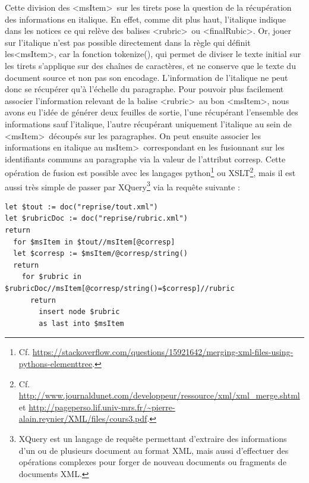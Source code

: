 \documentclass[a4paper,12pt,twoside]{book}
\begin{document}
Cette division des \textless msItem\textgreater~sur les tirets pose la question de la récupération des informations en italique. En effet, comme dit plus haut, l'italique indique dans les notices ce qui relève des balises \textless rubric\textgreater~ou \textless finalRubic\textgreater . Or, jouer sur l'italique n'est pas possible directement dans la règle qui définit les\textless msItem\textgreater, car la fonction tokenize(), qui permet de diviser le texte initial sur les tirets s'applique sur des chaînes de caractères, et ne conserve que le texte du document source et non pas son encodage. L'information de l'italique ne peut donc se récupérer qu'à l'échelle du paragraphe. Pour pouvoir plus facilement associer l'information relevant de la balise \textless rubric\textgreater~au bon \textless msItem\textgreater, nous avons eu l'idée de générer deux feuilles de sortie, l'une récupérant l'ensemble des informations sauf l'italique, l'autre récupérant uniquement l'italique au sein de \textless msItem\textgreater~découpés sur les paragraphes. On peut ensuite associer les informations en italique au \texles msItem\textgreater~correspondant en les fusionnant sur les identifiants communs au paragraphe via la valeur de l'attribut corresp. Cette opération de fusion est possible avec les langages python\footnote{Cf. \url{https://stackoverflow.com/questions/15921642/merging-xml-files-using-pythons-elementtree}.} ou XSLT\footnote{Cf. \url{http://www.journaldunet.com/developpeur/ressource/xml/xml_merge.shtml} et \url{http://pageperso.lif.univ-mrs.fr/~pierre-alain.reynier/XML/files/cours3.pdf}.}, mais il est aussi très simple de passer par XQuery\footnote{XQuery est un langage de requête permettant d'extraire des informations d'un ou de plusieurs document au format XML, mais aussi d'effectuer des opérations complexes pour forger de nouveau documents ou fragments de documents XML.} via la requête suivante : 
\begin{verbatim}
let $tout := doc("reprise/tout.xml")
let $rubricDoc := doc("reprise/rubric.xml")
return 
  for $msItem in $tout//msItem[@corresp]
  let $corresp := $msItem/@corresp/string()
  return 
    for $rubric in $rubricDoc//msItem[@corresp/string()=$corresp]//rubric
      return 
        insert node $rubric
        as last into $msItem
\end{verbatim}
\end{document}
